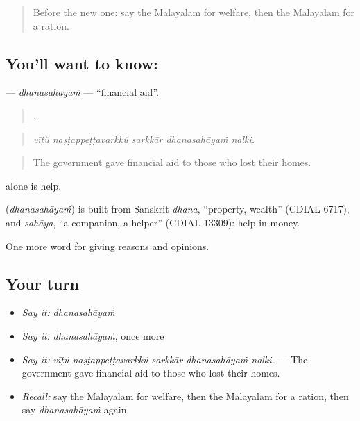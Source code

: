 \begin{quote}
Before the new one: say the Malayalam for welfare, then the Malayalam for a ration.
\end{quote}

\subsection*{You'll want to know: }
\textbf{} — \emph{dhanasahāyaṁ} — \textquotedblleft{}financial aid\textquotedblright{}.

\begin{quote}
    .
\end{quote}

\begin{quote}
\emph{vīṭŭ naṣṭappeṭṭavarkkŭ sarkkār dhanasahāyaṁ nalki.}
\end{quote}

\begin{quote}
The government gave financial aid to those who lost their homes.
\end{quote}

 alone is help.

\begin{cousinweb}
\textbf{} (\emph{dhanasahāyaṁ}) is built from Sanskrit \emph{dhana}, \textquotedblleft{}property, wealth\textquotedblright{} (CDIAL 6717), and \emph{sahāya}, \textquotedblleft{}a companion, a helper\textquotedblright{} (CDIAL 13309): help in money.
\end{cousinweb}

\begin{grammarlens}[title={What you've built}]
One more word for giving reasons and opinions.
\end{grammarlens}

\subsection*{Your turn}
\begin{itemize}
\raggedright
  \item \emph{Say it:} \emph{dhanasahāyaṁ}
  \item \emph{Say it:} \emph{dhanasahāyaṁ}, once more
  \item \emph{Say it:} \emph{vīṭŭ naṣṭappeṭṭavarkkŭ sarkkār dhanasahāyaṁ nalki.} — The government gave financial aid to those who lost their homes.
  \item \emph{Recall:} say the Malayalam for welfare, then the Malayalam for a ration, then say \emph{dhanasahāyaṁ} again
\end{itemize}

